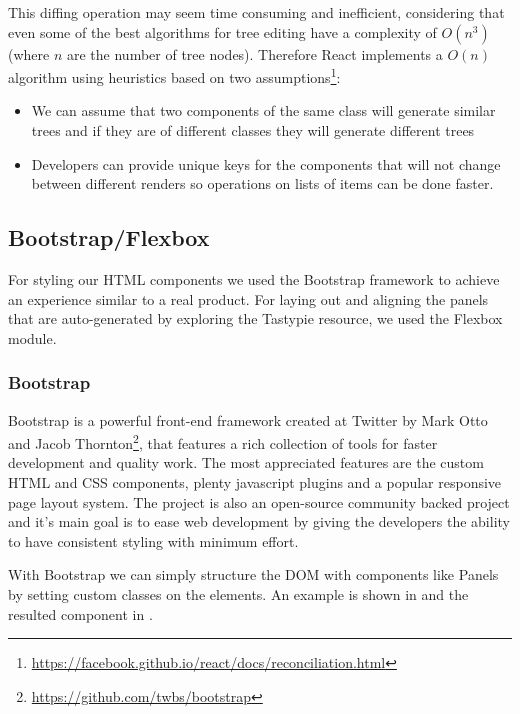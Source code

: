 
This diffing operation may seem time consuming and inefficient, considering that even some of the best algorithms for tree editing have a complexity of $O(n^3)$\cite{trees} (where $n$ are the number of tree nodes). Therefore React implements a $O(n)$ algorithm using heuristics based on two assumptions\footnote{\url{https://facebook.github.io/react/docs/reconciliation.html}}:

\begin{itemize}
	\item We can assume that two components of the same class will generate similar trees and if they are of different classes they will generate different trees
	\item Developers can provide unique keys for the components that will not change between different renders so operations on lists of items can be done faster.
\end{itemize}




\subsection{Bootstrap/Flexbox}
\label{sub-sec:bootstrap}

For styling our HTML components we used the Bootstrap framework to achieve an experience similar to a real product. For laying out and aligning the panels that are auto-generated by exploring the Tastypie resource, we used the Flexbox module. 

\subsubsection{Bootstrap}
\label{sub-sub-sec:bootstrap}

Bootstrap is a powerful front-end framework created at Twitter by Mark Otto and Jacob Thornton\footnote{\url{https://github.com/twbs/bootstrap}}, that features a rich collection of tools for faster development and quality work. The most appreciated features are the custom HTML and CSS components, plenty javascript plugins and a popular responsive page layout system. The project is also an open-source community backed project and it's main goal is to ease web development by giving the developers the ability to have consistent styling with minimum effort.

With Bootstrap we can simply structure the DOM with components like Panels by setting custom classes on the elements. An example is shown in  and the resulted component in .

